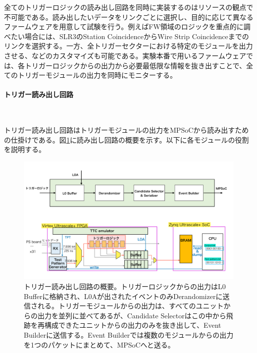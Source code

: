 全てのトリガーロジックの読み出し回路を同時に実装するのはリソースの観点で不可能である。読み出したいデータをリンクごとに選択し、目的に応じて異なるファームウェアを用意して試験を行う。例えばFW領域のロジックを重点的に調べたい場合には、SLR3のStation CoincidenceからWire Strip Coincidenceまでのリンクを選択する。一方、全トリガーセクターにおける特定のモジュールを出力させる、などのカスタマイズも可能である。実験本番で用いるファームウェアでは、各トリガーロジックからの出力から必要最低限な情報を抜き出すことで、全てのトリガーモジュールの出力を同時にモニターする。

\paragraph{トリガー読み出し回路}　　
\par
トリガー読み出し回路はトリガーモジュールの出力をMPSoCから読み出すための仕掛けである。図\ref{Readout_Circuite}に読み出し回路の概要を示す。以下に各モジュールの役割を説明する。

\begin{figure} 
\centering
\includegraphics[width=16cm]{fig/Test/Readout_Circuite.pdf}
\caption[トリガー読み出し回路の概要]{トリガー読み出し回路の概要。トリガーロジックからの出力はL0 Bufferに格納され、L0Aが出されたイベントのみDerandomizerに送信される。トリガーモジュールからの出力は、すべてのユニットからの出力を並列に並べてあるが、Candidate Selectorはこの中から飛跡を再構成できたユニットからの出力のみを抜き出して、Event Builderに送信する。Event Builderでは複数のモジュールからの出力を1つのパケットにまとめて、MPSoCへと送る。}
\label{Readout_Circuite}
\end{figure}

